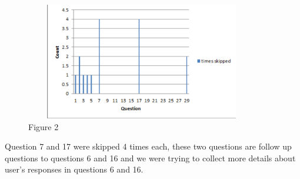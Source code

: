 \documentclass{llncs}
\begin{document}
\begin{figure}
\includegraphics[width=4.01in,height=2.01in]{figure2}
\caption{Figure 2}
\end{figure}


Question 7 and 17 were skipped 4 times each, these two questions are follow
up questions to questions 6 and 16 and we were trying to collect more
details about user's responses in questions 6 and 16.
\end{document}
